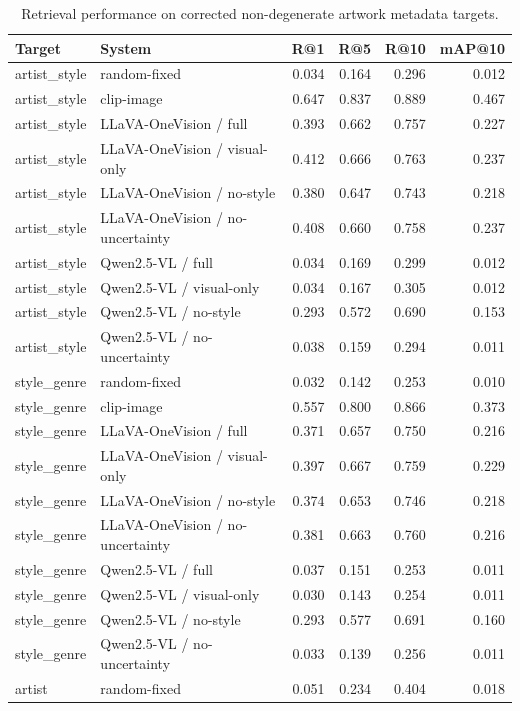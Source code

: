 \begin{table}
\caption{Retrieval performance on corrected non-degenerate artwork metadata targets.}
\label{tab:retrieval_corrected}
\begin{tabular}{llrrrr}
\toprule
Target & System & R@1 & R@5 & R@10 & mAP@10 \\
\midrule
artist_style & random-fixed & 0.034 & 0.164 & 0.296 & 0.012 \\
artist_style & clip-image & 0.647 & 0.837 & 0.889 & 0.467 \\
artist_style & LLaVA-OneVision / full & 0.393 & 0.662 & 0.757 & 0.227 \\
artist_style & LLaVA-OneVision / visual-only & 0.412 & 0.666 & 0.763 & 0.237 \\
artist_style & LLaVA-OneVision / no-style & 0.380 & 0.647 & 0.743 & 0.218 \\
artist_style & LLaVA-OneVision / no-uncertainty & 0.408 & 0.660 & 0.758 & 0.237 \\
artist_style & Qwen2.5-VL / full & 0.034 & 0.169 & 0.299 & 0.012 \\
artist_style & Qwen2.5-VL / visual-only & 0.034 & 0.167 & 0.305 & 0.012 \\
artist_style & Qwen2.5-VL / no-style & 0.293 & 0.572 & 0.690 & 0.153 \\
artist_style & Qwen2.5-VL / no-uncertainty & 0.038 & 0.159 & 0.294 & 0.011 \\
style_genre & random-fixed & 0.032 & 0.142 & 0.253 & 0.010 \\
style_genre & clip-image & 0.557 & 0.800 & 0.866 & 0.373 \\
style_genre & LLaVA-OneVision / full & 0.371 & 0.657 & 0.750 & 0.216 \\
style_genre & LLaVA-OneVision / visual-only & 0.397 & 0.667 & 0.759 & 0.229 \\
style_genre & LLaVA-OneVision / no-style & 0.374 & 0.653 & 0.746 & 0.218 \\
style_genre & LLaVA-OneVision / no-uncertainty & 0.381 & 0.663 & 0.760 & 0.216 \\
style_genre & Qwen2.5-VL / full & 0.037 & 0.151 & 0.253 & 0.011 \\
style_genre & Qwen2.5-VL / visual-only & 0.030 & 0.143 & 0.254 & 0.011 \\
style_genre & Qwen2.5-VL / no-style & 0.293 & 0.577 & 0.691 & 0.160 \\
style_genre & Qwen2.5-VL / no-uncertainty & 0.033 & 0.139 & 0.256 & 0.011 \\
artist & random-fixed & 0.051 & 0.234 & 0.404 & 0.018 \\

\end{tabular}
\end{table}
